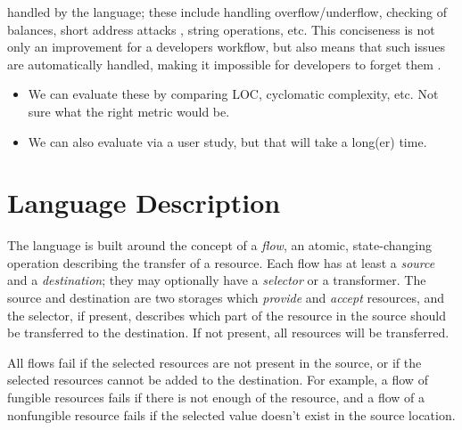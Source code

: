 \documentclass[sigconf]{acmart}
\begin{document}
        handled by the language; these include handling overflow/underflow, checking of balances, short address attacks , string operations, etc.
        This conciseness is not only an improvement for a developers workflow, but also means that such issues are automatically handled, making it impossible for developers to forget them .
        \begin{itemize}
            \item We can evaluate these by comparing LOC, cyclomatic complexity, etc.
                Not sure what the right metric would be.

            \item We can also evaluate via a user study, but that will take a long(er) time.
        \end{itemize}

\section{Language Description}
The \langName language is built around the concept of a \emph{flow}, an atomic, state-changing operation describing the transfer of a resource.
Each flow has at least a \emph{source} and a \emph{destination}; they may optionally have a \emph{selector} or a transformer.
The source and destination are two storages which \emph{provide} and \emph{accept} resources, and the selector, if present, describes which part of the resource in the source should be transferred to the destination.
If not present, all resources will be transferred.

All flows fail if the selected resources are not present in the source, or if the selected resources cannot be added to the destination.
For example, a flow of fungible resources fails if there is not enough of the resource, and a flow of a nonfungible resource fails if the selected value doesn't exist in the source location.
\end{document}
